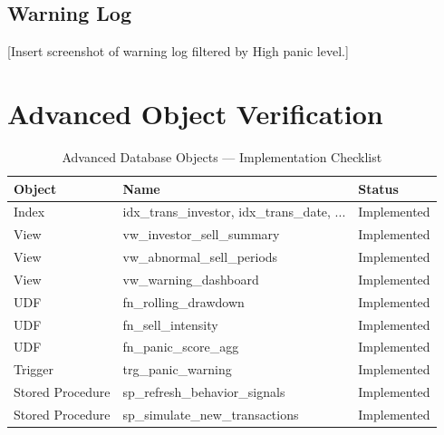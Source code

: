 \subsection{Warning Log}
[Insert screenshot of warning log filtered by High panic level.]

\section{Advanced Object Verification}

\begin{table}[H]
    \centering
    \caption{Advanced Database Objects — Implementation Checklist}
    \begin{tabular}{lll}
        \toprule
        \textbf{Object} & \textbf{Name} & \textbf{Status} \\
        \midrule
        Index & idx\_trans\_investor, idx\_trans\_date, ... & Implemented \\
        View & vw\_investor\_sell\_summary & Implemented \\
        View & vw\_abnormal\_sell\_periods & Implemented \\
        View & vw\_warning\_dashboard & Implemented \\
        UDF & fn\_rolling\_drawdown & Implemented \\
        UDF & fn\_sell\_intensity & Implemented \\
        UDF & fn\_panic\_score\_agg & Implemented \\
        Trigger & trg\_panic\_warning & Implemented \\
        Stored Procedure & sp\_refresh\_behavior\_signals & Implemented \\
        Stored Procedure & sp\_simulate\_new\_transactions & Implemented \\
        \bottomrule
    \end{tabular}
\end{table}
